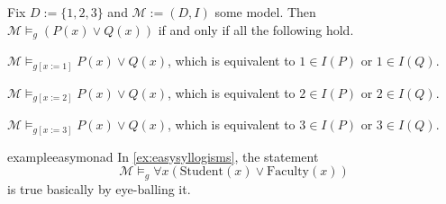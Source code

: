 \begin{example}
	Fix $D:=\{1,2,3\}$ and $\mathcal M:=(D,I)$ some model. Then $\mathcal M\models_g(P(x)\lor Q(x))$ if and only if all the following hold.
	\begin{listroman}
		\item $\mathcal M\models_{g[x:=1]}P(x)\lor Q(x)$, which is equivalent to $1\in I(P)$ or $1\in I(Q)$.
		\item $\mathcal M\models_{g[x:=2]}P(x)\lor Q(x)$, which is equivalent to $2\in I(P)$ or $2\in I(Q)$.
		\item $\mathcal M\models_{g[x:=3]}P(x)\lor Q(x)$, which is equivalent to $3\in I(P)$ or $3\in I(Q)$.
	\end{listroman}
\end{example}
\begin{restatable}{example}{easymonad}
	In \autoref{ex:easysyllogisms}, the statement
	\[\mathcal M\models_g\forall x(\mathrm{Student}(x)\lor\mathrm{Faculty}(x))\]
	is true basically by eye-balling it.
\end{restatable}